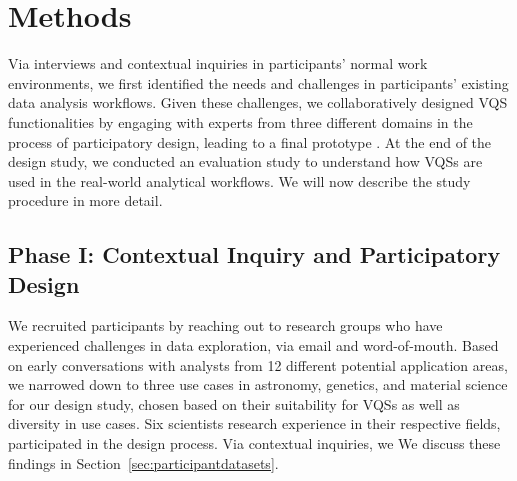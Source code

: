   \section{Methods\label{sec:methods}}
  Via interviews and contextual inquiries in participants' normal work environments, we first identified the needs and challenges in participants' existing data analysis workflows. Given these challenges, we collaboratively designed VQS functionalities by engaging with experts from three different domains in the process of participatory design, leading to a final prototype \zvpp. At the end of the design study, we conducted an evaluation study to understand how VQSs are used in the real-world analytical workflows. We will now describe the study procedure in more detail.
  \subsection{Phase I: Contextual Inquiry and Participatory Design}
  \par We recruited participants by reaching out to research groups who have experienced challenges in data exploration, via email and word-of-mouth. Based on early conversations with analysts from 12 different potential application areas, we narrowed down to three use cases in astronomy, genetics, and material science for our design study, chosen based on their suitability for VQSs as well as diversity in use cases. Six scientists  research experience in their respective fields, participated in the design process. Via  contextual inquiries, we  We discuss these findings in Section~\ref{sec:participantdatasets}.%
